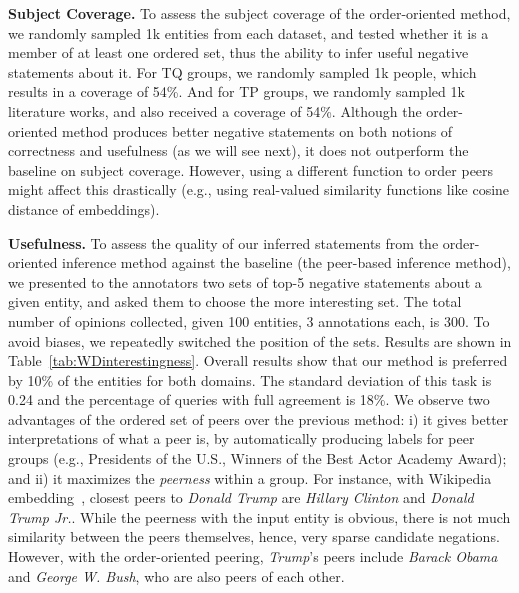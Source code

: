 \noindent
\textbf{Subject Coverage.} To assess the subject coverage of the order-oriented method, we randomly sampled 1k entities from each dataset, and tested whether it is a member of at least one ordered set, thus the ability to infer useful negative statements about it. For TQ groups, we randomly sampled 1k people, which results in a  coverage of 54\%. And for TP groups, we randomly sampled 1k literature works, and also received a coverage of 54\%. Although the order-oriented method produces better negative statements on both notions of correctness and usefulness (as we will see next), it does not outperform the baseline on subject coverage. However, using a different function to order peers might affect this drastically (e.g., using real-valued similarity functions like cosine distance of embeddings).

\noindent
\textbf{Usefulness.} To assess the quality of our inferred statements from the order-oriented inference method against the baseline (the peer-based inference method), we presented to the annotators two sets of top-5 negative statements about a given entity, and asked them to choose the more interesting set. The total number of opinions collected, given 100 entities, 3 annotations each, is 300. To avoid biases, we repeatedly switched the position of the sets. Results are shown in Table~\ref{tab:WDinterestingness}. Overall results show that our method is preferred by 10\% of the entities for both domains. The standard deviation of this task is 0.24 and the percentage of queries with full agreement is 18\%. We observe two advantages of the ordered set of peers over the previous method: i) it gives better interpretations of what a peer is, by automatically producing labels for peer groups (e.g., Presidents of the U.S., Winners of the Best Actor Academy Award); and ii) it maximizes the \textit{peerness} within a group. For instance, with Wikipedia embedding~\cite{wikipedia2vec}, closest peers to \textit{Donald Trump} are \textit{Hillary Clinton} and \textit{Donald Trump Jr.}. While the peerness with the input entity is obvious, there is not much similarity between the peers themselves, hence, very sparse candidate negations. However, with the order-oriented peering, \textit{Trump}'s peers include \textit{Barack Obama} and \textit{George W. Bush}, who are also peers of each other. 

